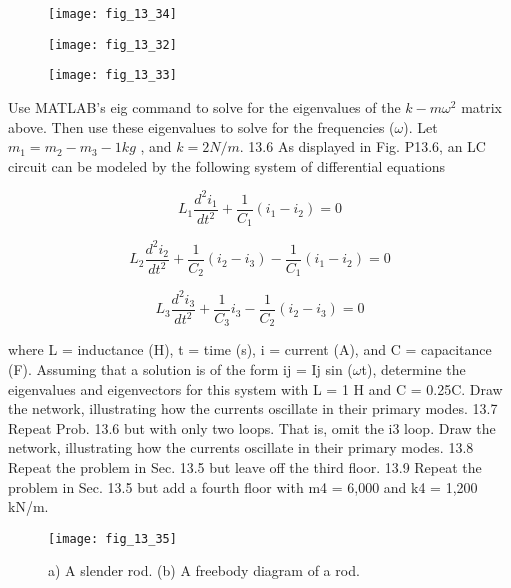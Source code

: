 \documentclass[../main.tex]{subfiles}
\begin{document}
\begin{figure}[H]
		\centering	\texttt{[image: fig\_13\_34]}
	   \label{fig:fig_13_34}
\end{figure}

\begin{figure}[H]
\texttt{[image: fig\_13\_32]}
	   \label{fig:fig_13_32}
\end{figure}

\begin{figure}[H]
\texttt{[image: fig\_13\_33]}
	   \label{fig:fig_13_33}
\end{figure}

Use MATLAB's eig command to solve for the eigenvalues
of the $k - m\omega^{2}$ matrix above. Then use these eigenvalues to
solve for the frequencies ($\omega$). Let $m_{1} = m_{2} - m_{3} - 1 kg$ , and
$k = 2 N/m$.
13.6 As displayed in Fig. P13.6, an LC circuit can be modeled by the following system of differential equations

\begin{equation}
L_{1}\frac{d^{2}i_{1}}{dt^{2}}+\frac{1}{C_{1}}(i_{1}-i_{2})=0
\end{equation}

\begin{equation}
L_{2}\frac{d^{2}i_{2}}{dt^{2}}+\frac{1}{C_{2}}(i_{2}-i_{3})-\frac{1}{C_{1}}(i_{1}-i_{2})=0
\end{equation}

\begin{equation}
L_{3}\frac{d^{2}i_{3}}{dt^{2}}+\frac{1}{C_{3}}i_{3}-\frac{1}{C_{2}}(i_{2}-i_{3})=0
\end{equation}


where L = inductance (H), t = time (s), i = current (A), and
C = capacitance (F). Assuming that a solution is of the form
ij = Ij sin ($\omega$t), determine the eigenvalues and eigenvectors for
this system with L = 1 H and C = 0.25C. Draw the network,
illustrating how the currents oscillate in their primary modes.
13.7 Repeat Prob. 13.6 but with only two loops. That is,
omit the i3 loop. Draw the network, illustrating how the currents oscillate in their primary modes.
13.8 Repeat the problem in Sec. 13.5 but leave off the third
floor.
13.9 Repeat the problem in Sec. 13.5 but add a fourth floor
with m4 = 6,000 and k4 = 1,200 kN/m.

\begin{figure}[H]
		\centering
		\texttt{[image: fig\_13\_35]}
	   \caption{\textsf{a) A slender rod. (b) A freebody diagram of a rod.}}
	   \label{fig:fig_13_35}
\end{figure}
\end{document}
